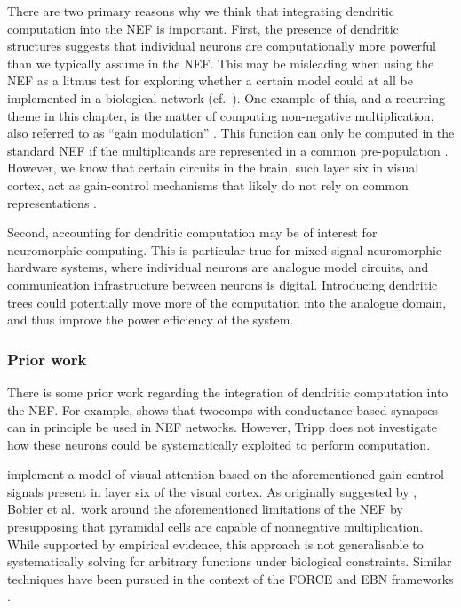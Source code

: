 There are two primary reasons why we think that integrating dendritic computation into the NEF is important.
First, the presence of dendritic structures suggests that individual neurons are computationally more powerful than we typically assume in the NEF.
This may be misleading when using the NEF as a litmus test for exploring whether a certain model could at all be implemented in a biological network (cf.~).
One example of this, and a recurring theme in this chapter, is the matter of computing non-negative multiplication, also referred to as \enquote{gain modulation} \citep{salinas2000gain}.
This function can only be computed in the standard NEF if the multiplicands are represented in a common pre-population \citep[Section~6.3]{eliasmith2003neural}.
However, we know that certain circuits in the brain, such layer six in visual cortex, act as gain-control mechanisms that likely do not rely on common representations \citep{olsen2012gain,bobier2014unifying}.

Second, accounting for dendritic computation may be of interest for neuromorphic computing.
This is particular true for mixed-signal neuromorphic hardware systems, where individual neurons are analogue model circuits, and communication infrastructure between neurons is digital.
Introducing dendritic trees could potentially move more of the computation into the analogue domain, and thus improve the power efficiency of the system.

\subsubsection{Prior work}
There is some prior work regarding the integration of dendritic computation into the NEF.
For example,  shows that \glspl{twocomp} with conductance-based synapses can in principle be used in NEF networks.
However, Tripp does not investigate how these neurons could be systematically exploited to perform computation.

 implement a model of visual attention based on the aforementioned gain-control signals present in layer six of the visual cortex.
As originally suggested by , Bobier et al.~work around the aforementioned limitations of the NEF by presupposing that pyramidal cells are capable of nonnegative multiplication.
While supported by empirical evidence, this approach is not generalisable to systematically solving for arbitrary functions under biological constraints.
Similar techniques have been pursued in the context of the FORCE and EBN frameworks \citep{thalmeier2016learning,alemi2018learning}.

